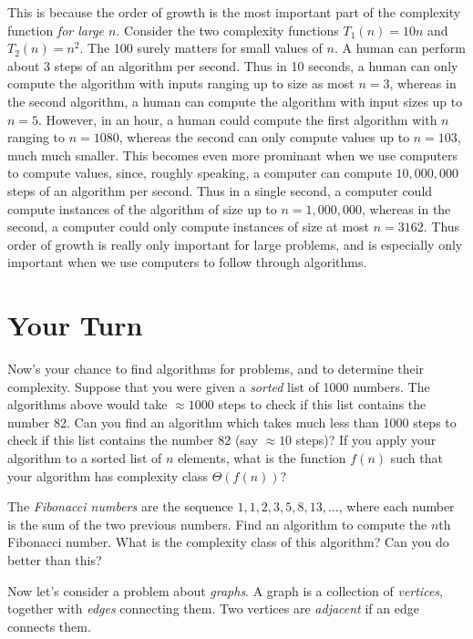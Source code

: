 \documentclass{article}
\theoremstyle{plain}
\theoremstyle{remark}
\theoremstyle{definition}
\begin{document}
This is because the order of growth is the most important part of the complexity function \emph{for large $n$}. Consider the two complexity functions $T_1(n) = 10n$ and $T_2(n) = n^2$. The 100 surely matters for small values of $n$. A human can perform about 3 steps of an algorithm per second. Thus in 10 seconds, a human can only compute the algorithm with inputs ranging up to size as most $n = 3$, whereas in the second algorithm, a human can compute the algorithm with input sizes up to $n = 5$. However, in an hour, a human could compute the first algorithm with $n$ ranging to $n = 1080$, whereas the second can only compute values up to $n = 103$, much much smaller. This becomes even more prominant when we use computers to compute values, since, roughly speaking, a computer can compute $10,000,000$ steps of an algorithm per second. Thus in a single second, a computer could compute instances of the algorithm of size up to $n = 1,000,000$, whereas in the second, a computer could only compute instances of size at most $n = 3162$. Thus order of growth is really only important for large problems, and is especially only important when we use computers to follow through algorithms.

\section{Your Turn}

Now's your chance to find algorithms for problems, and to determine their complexity. Suppose that you were given a \emph{sorted} list of 1000 numbers. The algorithms above would take $\approx 1000$ steps to check if this list contains the number 82. Can you find an algorithm which takes much less than 1000 steps to check if this list contains the number 82 (say $\approx 10$ steps)? If you apply your algorithm to a sorted list of $n$ elements, what is the function $f(n)$ such that your algorithm has complexity class $\Theta(f(n))$?

The \emph{Fibonacci numbers} are the sequence $1,1,2,3,5,8,13,\dots$, where each number is the sum of the two previous numbers. Find an algorithm to compute the $n$th Fibonacci number. What is the complexity class of this algorithm? Can you do better than this?

Now let's consider a problem about \emph{graphs}. A graph is a collection of \emph{vertices}, together with \emph{edges} connecting them. Two vertices are \emph{adjacent} if an edge connects them.


\vspace{4em}
\end{document}
